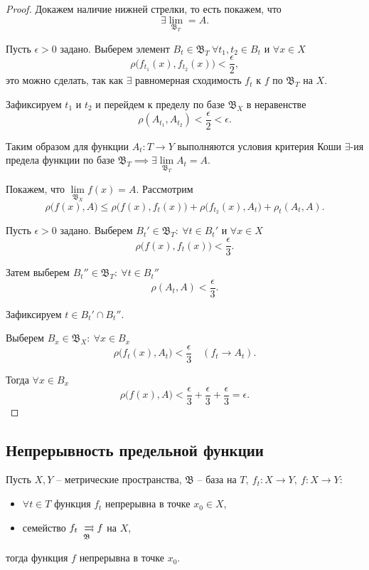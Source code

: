 \begin{proof}
    Докажем наличие нижней стрелки, то есть покажем, что
    \[
        \exists \underset{\mathfrak{B}_T}{\lim} = A.
    \]

    Пусть $ \epsilon > 0 $ задано. Выберем элемент $ B_t \in \mathfrak{B}_T \ \forall t_1,t_2 \in B_t $ и $ \forall x \in X $
    \[
        \rho\big(f_{t_1}(x),f_{t_2}(x)\big) < \frac{\epsilon}{2},
    \]
    это можно сделать, так как $ \exists $ равномерная сходимость $ f_t $ к $ f $ по $ \mathfrak{B}_T $ на $ X $.

    Зафиксируем $ t_1 $ и $ t_2 $ и перейдем к пределу по базе $ \mathfrak{B}_X $ в неравенстве
    \[
        \rho(A_{t_1},A_{t_2}) < \frac{\epsilon}{2} < \epsilon.
    \]

    Таким образом для функции $ A_t: T \rightarrow Y $ выполняются условия критерия Коши $ \exists $-ия предела функции по базе $ \mathfrak{B}_T \implies \exists \underset{\mathfrak{B}_T}{\lim}A_t = A $.

    Покажем, что $ \underset{\mathfrak{B}_X}{\lim}f(x) = A $. Рассмотрим
    \[
        \rho\big(f(x),A\big) \leqslant \rho\big(f(x),f_t(x)\big) + \rho\big(f_{t_2}(x),A_t\big) + \rho_t(A_t,A).
    \]

    Пусть $ \epsilon > 0 $ задано. Выберем $ B_t' \in \mathfrak{B}_T: \ \forall t \in B_t' $ и $ \forall x \in X $
    \[
        \rho\big(f(x),f_t(x)\big) < \frac{\epsilon}{3}.
    \]

    Затем выберем $ B_t'' \in \mathfrak{B}_T: \ \forall t \in B_t'' $
    \[
        \rho(A_t,A) < \frac{\epsilon}{3}.
    \]

    Зафиксируем $ t \in B_t' \cap B_t''$.

    Выберем $ B_x \in \mathfrak{B}_X: \ \forall x \in B_x $
    \[
        \rho\big(f_t(x),A_t\big) < \frac{\epsilon}{3} \quad (f_t \rightarrow A_t).
    \]

    Тогда $ \forall x \in B_x $
    \[
        \rho\big(f(x),A\big) < \frac{\epsilon}{3} + \frac{\epsilon}{3} + \frac{\epsilon}{3} = \epsilon.
    \]
\end{proof}

\subsection{Непрерывность предельной функции}

\begin{theorem}
    Пусть $ X,Y $ -- метрические пространства, $ \mathfrak{B} $ -- база на $ T, \ f_t: X \rightarrow Y, \ f: X \rightarrow Y $:
    \begin{itemize}
        \item $ \forall t \in T $ функция $ f_t $ непрерывна в точке $ x_0 \in X $,
        \item семейство $ f_t \xrightrightarrows[\mathfrak{B}]{} f $ на $ X $,
    \end{itemize}
    тогда функция $ f $ непрерывна в точке $ x_0 $.
\end{theorem}

